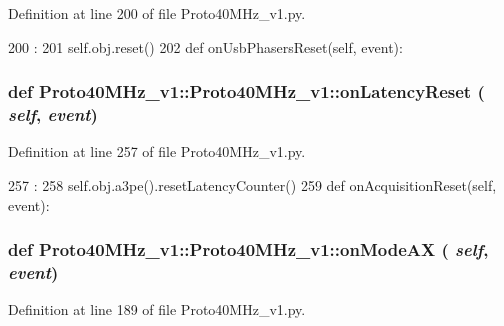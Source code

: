 Definition at line 200 of file Proto40MHz\_\-v1.py.


\begin{DoxyCode}
200                                   :
201         self.obj.reset()
202 
    def onUsbPhasersReset(self, event):
\end{DoxyCode}
\hypertarget{classProto40MHz__v1_1_1Proto40MHz__v1_a1f93ad8c3471e219423f0ac4ab3e51d3}{
\subsubsection[{onLatencyReset}]{\setlength{\rightskip}{0pt plus 5cm}def Proto40MHz\_\-v1::Proto40MHz\_\-v1::onLatencyReset ( {\em self}, \/   {\em event})}}
\label{classProto40MHz__v1_1_1Proto40MHz__v1_a1f93ad8c3471e219423f0ac4ab3e51d3}


Definition at line 257 of file Proto40MHz\_\-v1.py.


\begin{DoxyCode}
257                                    :
258         self.obj.a3pe().resetLatencyCounter()
259 
    def onAcquisitionReset(self, event):
\end{DoxyCode}
\hypertarget{classProto40MHz__v1_1_1Proto40MHz__v1_acfd6d650ac779f0837c462e9f7064d2c}{
\subsubsection[{onModeAX}]{\setlength{\rightskip}{0pt plus 5cm}def Proto40MHz\_\-v1::Proto40MHz\_\-v1::onModeAX ( {\em self}, \/   {\em event})}}
\label{classProto40MHz__v1_1_1Proto40MHz__v1_acfd6d650ac779f0837c462e9f7064d2c}


Definition at line 189 of file Proto40MHz\_\-v1.py.


